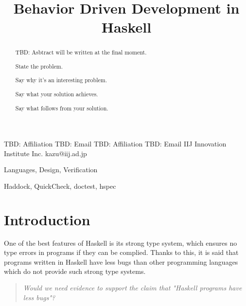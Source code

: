 \documentclass[preprint]{sigplanconf}
\begin{document}
\copyrightdata{[to be supplied]}


\title{Behavior Driven Development in Haskell}

           {TBD: Affiliation}
           {TBD: Email}
           {TBD: Affiliation}
           {TBD: Email}
           {IIJ Innovation Institute Inc.}
           {kazu@iij.ad.jp}

\maketitle

\begin{abstract}

TBD: Asbtract will be written at the final moment.

State the problem.

Say why it’s an interesting problem.

Say what your solution achieves.

Say what follows from your solution.

\end{abstract}


\terms Languages, Design, Verification

\keywords Haddock, QuickCheck, doctest, hspec

\section{Introduction}


One of the best features of Haskell is its strong type system, 
which ensures no type errors in programs if they can be complied.
Thanks to this, it is said that programs written in Haskell have less bugs
than other programming languages which do not provide such strong type systems.

\begin{quote}
    \emph{Would we need evidence to support the claim that "Haskell programs have less bugs"?}
\end{quote}
\end{document}
